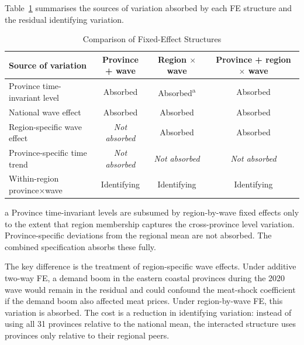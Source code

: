 Table~\ref{tab:fe_comparison} summarises the sources of
variation absorbed by each FE structure and the residual
identifying variation.

\begin{table}[htbp]
\centering
\caption{Comparison of Fixed-Effect Structures}
\label{tab:fe_comparison}
\begin{threeparttable}
\footnotesize
\begin{tabular}{p{4.2cm}ccc}
\toprule
Source of variation & \shortstack{Province\\+ wave} & \shortstack{Region\\$\times$ wave} & \shortstack{Province + \\region $\times$ wave} \\
\midrule
Province time-invariant level     & Absorbed & Absorbed\textsuperscript{a} & Absorbed \\
National wave effect              & Absorbed & Absorbed & Absorbed \\
Region-specific wave effect       & \textit{Not absorbed} & Absorbed & Absorbed \\
Province-specific time trend      & \textit{Not absorbed} & \textit{Not absorbed} & \textit{Not absorbed} \\
Within-region province$\times$wave & Identifying & Identifying & Identifying \\
\bottomrule
\end{tabular}
\begin{tablenotes}[flushleft]
\footnotesize
\item[a] Province time-invariant levels are subsumed by
  region-by-wave fixed effects only to the extent that region
  membership captures the cross-province level variation.
  Province-specific deviations from the regional mean are not
  absorbed. The combined specification absorbs these fully.
\end{tablenotes}
\end{threeparttable}
\end{table}

The key difference is the treatment of region-specific wave
effects.
Under additive two-way FE, a demand boom in the eastern
coastal provinces during the 2020 wave would remain in the
residual and could confound the meat-shock coefficient if
the demand boom also affected meat prices.
Under region-by-wave FE, this variation is absorbed.
The cost is a reduction in identifying variation: instead of
using all 31 provinces relative to the national mean, the
interacted structure uses provinces only relative to their
regional peers.

